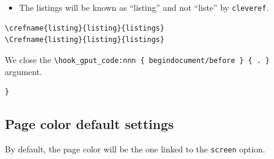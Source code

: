 \documentclass{letgut}
\begin{document}
\begin{itemize}
\begin{itemize}
currently does not work well in \lstinline+shipout/background+ (see
\url{https://github.com/ho-tex/luacolor/issues/4}).
\begin{lstlisting}
% % \bool_if:NF \g__letgut_paper_bool {
\bool_if:NT \g__letgut_draft_bool {
  % \RequirePackage[All]{lua-typo}
  \hook_gput_code:nnn { shipout/background } { . }
  {
    \__letgut_unselectable:n {
      \put(0.5\paperwidth,-0.5\paperheight)
      {
        \Huge
\end{lstlisting}
Currently, we can't use 's \lstinline+\color_fill:n+ (see
\url{https://github.com/ho-tex/luacolor/issues/4\#issuecomment-848774260})
and we have to rely on 's \lstinline+\color+.
\begin{lstlisting}
% \color_fill:n {black!10}
\color{black!10}
\hbox_set:Nn \l__letgut_tmpa_box {
  \fontsize{0.25\paperwidth}{0.3\paperwidth}
  \selectfont
  \c__letgut_draftwatermark_text_tl
}
\hbox_set:Nn \l__letgut_tmpb_box {
  \hbox_overlap_center:n {
    \box_use:N \l__letgut_tmpa_box
  }
}
\end{lstlisting}
The draft watermak is rotated in order to be parallely slanted to the first
diagonal of the page (angle \(=\arctan(\text{paper height}/\text{paper
    width})\)).
\begin{lstlisting}
\box_rotate:Nn \l__letgut_tmpb_box {
  \fp_eval:n {
    atand (
    \dim_to_fp:n {\paperheight}
    /
    \dim_to_fp:n {\paperwidth}
    )
  }
}
\box_use:N \l__letgut_tmpb_box
}
}
}
\end{lstlisting}
	    Moreover, we want all the overfull boxes to be shown (as with
\lstinline+draft+ option of the standard classes).
\begin{lstlisting}
\setlength\overfullrule{5pt}
}
% % }
\end{lstlisting}
\end{itemize}

\item The listings will be known as “listing” and not “liste” by \lstinline+cleveref+.
\end{itemize}
\begin{lstlisting}
\crefname{listing}{listing}{listings}
\Crefname{listing}{listing}{listings}
\end{lstlisting}

We close the \lstinline+\hook_gput_code:nnn { begindocument/before } { . }+ argument.

\begin{lstlisting}
}
\end{lstlisting}
\subsection{Page color default settings}
\label{ImplementationPagecolordefaultsettings-c1hg55h0jlj0}
By default, the page color will be the one linked to the \lstinline+screen+ option.
\end{document}
